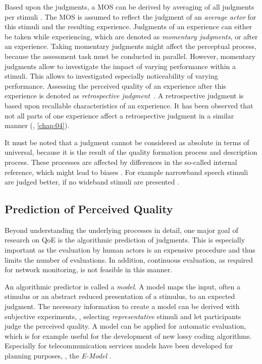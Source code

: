 Based upon the judgments, a \acf{MOS} can be derived by averaging of all judgments per stimuli \citep{itu-t_recommendation_p.800.2_mean_2013}.
The \ac{MOS} is assumed to reflect the judgment of an \emph{average actor} for this stimuli and the resulting experience.
Judgments of an experience can either be taken while experiencing, which are denoted as \emph{momentary judgments}, or after an experience.
Taking momentary judgments might affect the perceptual process, because the assessment task must be conducted in parallel. %
However, momentary judgments allow to investigate the impact of varying performance within a stimuli.
This allows to investigated especially noticeability of varying performance.
Assessing the perceived quality of an experience after this experience is denoted as \emph{retrospective judgment}~\citep[][]{weiss_temporal_2014}.
A retrospective judgment is based upon recallable characteristics of an experience.
It has been observed that not all parts of one experience affect a retrospective judgment in a similar manner (\cf, \autoref{chap:04}).

It must be noted that a judgment cannot be considered as absolute in terms of universal, because it is the result of the quality formation process and description process.
These processes are affected by differences in the so-called internal reference, which might lead to biases \citep[][]{zielinski_biases_2008, pitrey_aligning_2011}.
For example narrowband speech stimuli are judged better, if no wideband stimuli are presented \citep[][]{koster_comparison_2015}.

\subsection{Prediction of Perceived Quality}
Beyond understanding the underlying processes in detail, one major goal of research on \ac{QoE} is the algorithmic prediction of judgments.
This is especially important as the evaluation by human actors is an expensive procedure and thus limits the number of evaluations.
In addition, continuous evaluation, as required for network monitoring, is not feasible in this manner.

An algorithmic predictor is called a \emph{model}.
A model maps the input, often a stimulus or an abstract reduced presentation of a stimulus, to an expected judgment.
The necessary information to create a model can be derived with subjective experiments, \ie, selecting \emph{representative} stimuli and let participants judge the perceived quality.
A model can be applied for automatic evaluation, which is for example useful for the development of new lossy coding algorithms.
Especially for telecommunication services models have been developed for planning purposes, \eg, the \emph{E-Model} \citep{itu-t_recommendation_g.107_e-model_2015}.

